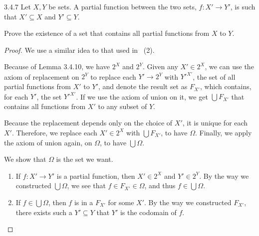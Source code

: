\begin{exercise}{3.4.7}
	Let $X,Y$ be sets. A partial function between the two sets, $f: X' \to Y'$, is such that $X' \subseteq X$ and $Y' \subseteq Y$.
	
	Prove the existence of a set that contains all partial functions from $X$ to $Y$.
\end{exercise}
\begin{proof}
	We use a similar idea to that used in ~(2).
	
	Because of Lemma 3.4.10, we have $2^X$ and $2^Y$. Given any $X' \in 2^X$, we can use the axiom of replacement on $2^Y$ to replace each $Y' \to 2^Y$ with $Y'^{X'}$, the set of all partial functions from $X'$ to $Y'$, and denote the result set as $F_{X'}$, which contains, for each $Y'$, the set $Y'^{X'}$. If we use the axiom of union on it, we get $\bigcup F_{X'}$ that contains all functions from $X'$ to any subset of $Y$.
	
	Because the replacement depends only on the choice of $X'$, it is unique for each $X'$. Therefore, we replace each $X' \in 2^X$ with $\bigcup F_{X'}$, to have $\Omega$. Finally, we apply the axiom of union again, on $\Omega$, to have $\bigcup \Omega$.
	
	We show that $\Omega$ is the set we want.
	\begin{enumerate}
		\item If $f: X' \to Y'$ is a partial function, then $X' \in 2^X$ and $Y' \in 2^Y$. By the way we constructed $\bigcup \Omega$, we see that $f \in F_{X'} \in \Omega$, and thus $f \in \bigcup \Omega$.
		
		\item If $f \in \bigcup \Omega$, then $f$ is in a $F_{X'}$ for some $X'$. By the way we constructed $F_{X'}$, there exists such a $Y' \subseteq Y$ that $Y'$ is the codomain of $f$.
	\end{enumerate}
\end{proof}

